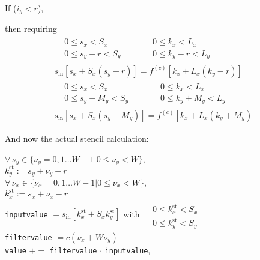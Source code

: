 \documentclass[10pt]{amsart}
\begin{document}
\begin{multicols*}{2}
If ($i_y < r$),

then requiring
\[
\begin{gathered}
  \begin{aligned}
    & 0 \leq s_x  < S_x \\ 
    & 0 \leq s_y -r < S_y
  \end{aligned} \quad \quad \,
  \begin{aligned}
    & 0 \leq k_x  < L_x \\ 
    & 0 \leq k_y -r < L_y
    \end{aligned} \\
  s_{\text{in}}[s_x + S_x(s_y-r)] = f^{(c)}[k_x + L_x (k_y-r)] \\ 
   \begin{aligned}
    & 0 \leq s_x  < S_x \\ 
    & 0 \leq s_y +M_y < S_y
  \end{aligned} \quad \quad \,
  \begin{aligned}
    & 0 \leq k_x  < L_x \\ 
    & 0 \leq k_y +M_y< L_y
  \end{aligned} \\
  s_{\text{in}}[s_x +  S_x(s_y+M_y)] = f^{(c)}[k_x  + L_x(k_y+M_y)]
\end{gathered}
\]

And now the actual stencil calculation:

$\forall \, \nu_y \in \lbrace \nu_y = 0 , 1 \dots W-1 | 0 \leq \nu_y < W \rbrace$, \\
\phantom{ \qquad \, } $k_y^{\text{st}} := s_y + \nu_y - r$ \\
\phantom{ \qquad \, } $\forall \, \nu_x \in \lbrace \nu_x = 0 , 1 \dots W-1 | 0 \leq \nu_x < W \rbrace$, \\
\phantom{ \qquad \qquad \, } $k_x^{\text{st}} := s_x + \nu_x -r $ \\
\phantom{ \qquad \qquad \, } \verb|inputvalue| $=s_{\text{in}}[k^{\text{st}}_x + S_x k_y^{\text{st}}]$ with $\begin{aligned} & \quad \\
  & 0 \leq k_x^{\text{st}} < S_x \\ 
  & 0 \leq k_y^{\text{st}} < S_y  \end{aligned}$ \\
\phantom{ \qquad \qquad \, } \verb|filtervalue| $ = c(\nu_x + W\nu_y)$  \\
\phantom{ \qquad \qquad \, } \verb|value| $+=$ \verb|filtervalue| $\cdot$ \verb|inputvalue|,


\end{multicols*}
\end{document}
